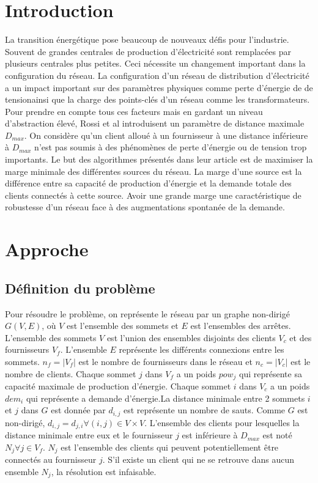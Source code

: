 \documentclass[12pt,a4paper]{article}
\begin{document}
\begin{multicols}{2}
\section{Introduction}
La transition énergétique pose beaucoup de nouveaux défis pour l'industrie. Souvent de grandes centrales de production d'électricité sont remplacées par plusieurs centrales plus petites. Ceci nécessite un changement important dans la configuration du réseau. La configuration d'un réseau de distribution d'électricité a un impact important sur des paramètres physiques comme perte d'énergie de de tensionainsi que la charge des points-clés d'un réseau comme les transformateurs. Pour prendre en compte tous ces facteurs mais en gardant un niveau d'abstraction élevé, Rossi et al \cite{Rossi} introduisent un paramètre de distance maximale $D_{max}$. On considère qu'un client alloué à un fournisseur à une distance inférieure à $D_{max}$ n'est pas soumis à des phénomènes de perte d'énergie ou de tension trop importants.\newline \indent
Le but des algorithmes présentés dans leur article est de maximiser la marge minimale des différentes sources du réseau. La marge d'une source est la différence entre sa capacité de production d'énergie et la demande totale des clients connectés à cette source.\newline \indent
Avoir une grande marge une caractéristique de robustesse d'un réseau face à des augmentations spontanée de la demande.
\section{Approche}
\subsection{Définition du problème}
Pour résoudre le problème, on représente le réseau par un graphe non-dirigé $G(V,E)$, où $V$ est l'ensemble des sommets et $E$ est l'ensembles des arrêtes. L'ensemble des sommets $V$ est l'union des ensembles disjoints des clients  $V_{c}$ et des fournisseurs $V_{f}$. L'ensemble $E$ représente les différents connexions entre les sommets. $n_{f}=|V_{f}| $ est le nombre de fournisseurs dans le réseau et $n_{c}=|V_{c}| $ est le nombre de clients. Chaque sommet $j$ dans $V_{f}$ a un poids $pow_{j}$ qui représente sa capacité maximale de production d'énergie. Chaque sommet $i$ dans $V_{c}$ a un poids $dem_{i}$ qui représente a demande d'énergie.La distance minimale entre 2 sommets $i$ et $j$ dans $G$ est donnée par $d_{i,j}$ est représente un nombre de sauts. Comme $G$ est non-dirigé, $d_{i,j}=d_{j,i} \forall (i,j) \in V \times V$. L'ensemble des clients pour lesquelles la distance minimale entre eux et le fournisseur $j$ est inférieure à $D_{max}$ est noté $N_{j} \forall j \in V_{f}$. $N_{j}$ est l'ensemble des clients qui peuvent potentiellement être connectés au fournisseur $j$. S'il existe un client qui ne se retrouve dans aucun ensemble $N_{j}$, la résolution est infaisable.

\end{multicols}
\end{document}
